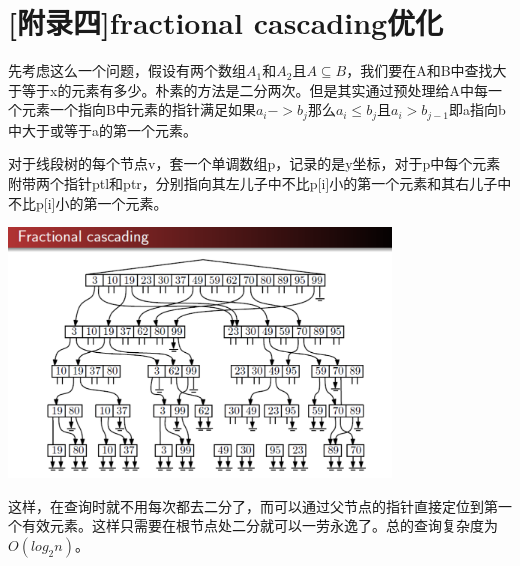\documentclass[10pt]{scrartcl}
\begin{document}
\section{[附录四]fractional cascading优化}
先考虑这么一个问题，假设有两个数组$A_1$和$A_2$且$A \subseteq B$，我们要在A和B中查找大于等于x的元素有多少。朴素的方法是二分两次。但是其实通过预处理给A中每一个元素一个指向B中元素的指针满足如果$a_i -> b_j$那么$a_i \leq b_j$且$a_i > b_{j-1}$即a指向b中大于或等于a的第一个元素。

对于线段树的每个节点v，套一个单调数组p，记录的是y坐标，对于p中每个元素附带两个指针ptl和ptr，分别指向其左儿子中不比p[i]小的第一个元素和其右儿子中不比p[i]小的第一个元素。

\includegraphics[width=4in]{fractional} 

这样，在查询时就不用每次都去二分了，而可以通过父节点的指针直接定位到第一个有效元素。这样只需要在根节点处二分就可以一劳永逸了。总的查询复杂度为$O(log_2n)$。


\end{document}
